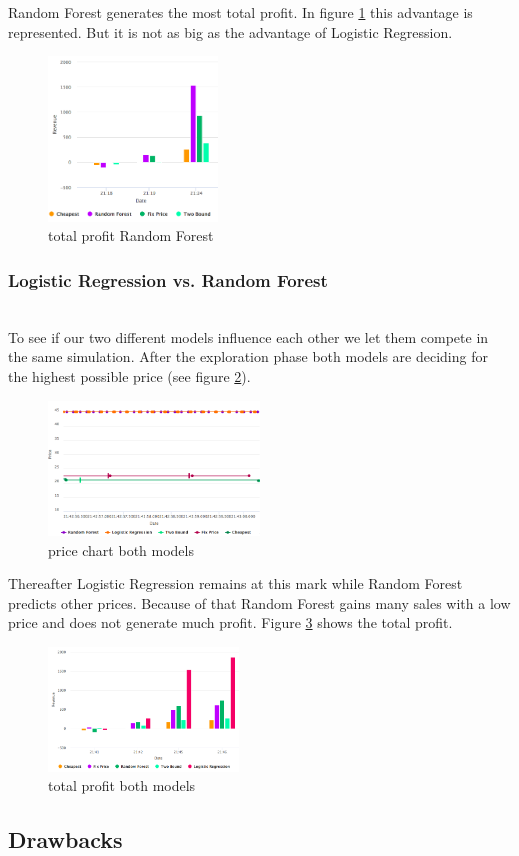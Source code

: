     Random Forest generates the most total profit. In figure \ref{fig6} this advantage is represented. But it is not as big as the advantage of Logistic Regression.

    \begin{figure}[ht]
        \centering
        \includegraphics[width=0.4\textwidth]{img/rndmfrst_total_profit.png}
        \caption{total profit Random Forest}
        \label{fig6}
    \end{figure} 


\subsubsection{Logistic Regression vs. Random Forest}
    ~\\
    To see if our two different models influence each other we let them compete in the same simulation. After the exploration phase both models are deciding for the highest possible price (see figure \ref{fig7}).
    \begin{figure}[ht]
        \centering
        \includegraphics[width=0.5\textwidth]{img/prices_both.png}
        \caption{price chart both models}
        \label{fig7}
    \end{figure} 

    Thereafter Logistic Regression remains at this mark while Random Forest predicts other prices. Because of that Random Forest gains many sales with a low price and does not generate much profit. Figure \ref{fig8} shows the total profit.

    \begin{figure}[ht]
        \centering
        \includegraphics[width=0.45\textwidth]{img/total_profit_both.png}
        \caption{total profit both models}
        \label{fig8}
    \end{figure} 


\subsection{Drawbacks}

